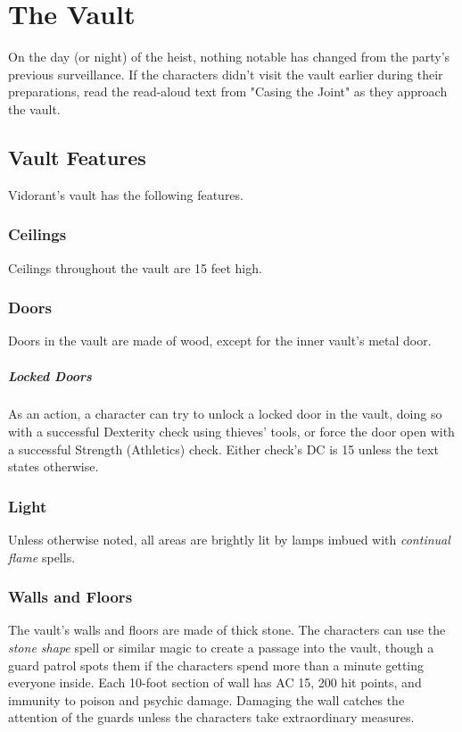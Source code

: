 \documentclass[10pt,a4paper,twoside,bg=print,twocolumn,openany,nodeprecatedcode]{dndbook}
\begin{document}
\section{The Vault}
On the day (or night) of the heist, nothing notable has changed from the party's previous surveillance. If the characters didn't visit the vault earlier during their preparations, read the read-aloud text from "Casing the Joint" as they approach the vault.

\subsection{Vault Features}
Vidorant's vault has the following features.

\subsubsection{Ceilings}
Ceilings throughout the vault are 15 feet high.

\subsubsection{Doors}
Doors in the vault are made of wood, except for the inner vault's metal door.

\subparagraph{Locked Doors}
As an action, a character can try to unlock a locked door in the vault, doing so with a successful Dexterity check using thieves' tools, or force the door open with a successful Strength (Athletics) check. Either check's DC is 15 unless the text states otherwise.

\subsubsection{Light}
Unless otherwise noted, all areas are brightly lit by lamps imbued with \textit{continual flame} spells.

\subsubsection{Walls and Floors}
The vault's walls and floors are made of thick stone. The characters can use the \textit{stone shape} spell or similar magic to create a passage into the vault, though a guard patrol spots them if the characters spend more than a minute getting everyone inside. Each 10-foot section of wall has AC 15, 200 hit points, and immunity to poison and psychic damage. Damaging the wall catches the attention of the guards unless the characters take extraordinary measures.
\end{document}
